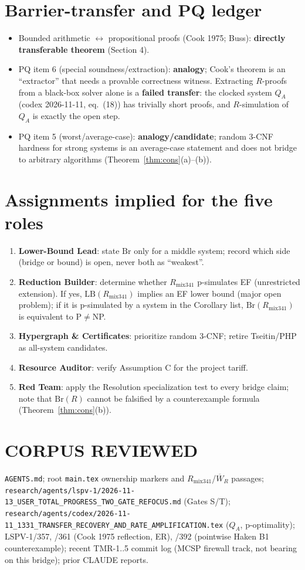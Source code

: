 \documentclass[11pt]{article}
\theoremstyle{definition}
\theoremstyle{remark}
\newcommand{\Br}{\mathrm{Br}}
\newcommand{\LB}{\mathrm{LB}}
\begin{document}
\section{Barrier-transfer and PQ ledger}
\begin{itemize}
\item Bounded arithmetic $\leftrightarrow$ propositional proofs (Cook 1975; Buss): \textbf{directly transferable theorem} (Section 4).
\item PQ item 6 (special soundness/extraction): \textbf{analogy}; Cook's theorem is an ``extractor'' that needs a provable
correctness witness. Extracting $R$-proofs from a black-box solver alone is a \textbf{failed transfer}: the clocked
system $Q_A$ (codex 2026-11-11, eq.~(18)) has trivially short proofs, and $R$-simulation of $Q_A$ is exactly the
open step.
\item PQ item 5 (worst/average-case): \textbf{analogy/candidate}; random 3-CNF hardness for strong systems is an
average-case statement and does not bridge to arbitrary algorithms (Theorem~\ref{thm:cons}(a)--(b)).
\end{itemize}

\section{Assignments implied for the five roles}
\begin{enumerate}
\item \textbf{Lower-Bound Lead}: state $\Br$ only for a middle system; record which side (bridge or bound) is open, never both as ``weakest''.
\item \textbf{Reduction Builder}: determine whether $R_{\mathrm{mix341}}$ p-simulates EF (unrestricted extension).
If yes, $\LB(R_{\mathrm{mix341}})$ implies an EF lower bound (major open problem); if it is p-simulated by a system
in the Corollary list, $\Br(R_{\mathrm{mix341}})$ is equivalent to P$\ne$NP.
\item \textbf{Hypergraph \& Certificates}: prioritize random 3-CNF; retire Tseitin/PHP as all-system candidates.
\item \textbf{Resource Auditor}: verify Assumption C for the project tariff.
\item \textbf{Red Team}: apply the Resolution specialization test to every bridge claim; note that $\Br(R)$ cannot be
falsified by a counterexample formula (Theorem~\ref{thm:cons}(b)).
\end{enumerate}

\section*{CORPUS REVIEWED}
\texttt{AGENTS.md}; root \texttt{main.tex} ownership markers and $R_{\mathrm{mix341}}$/$\overline W_R$ passages;
\texttt{research/agents/lspv-1/2026-11-13\_USER\_TOTAL\_PROGRESS\_TWO\_GATE\_REFOCUS.md} (Gates S/T);
\texttt{research/agents/codex/2026-11-11\_1331\_TRANSFER\_RECOVERY\_AND\_RATE\_AMPLIFICATION.tex} ($Q_A$, p-optimality);
LSPV-1/357, /361 (Cook 1975 reflection, ER), /392 (pointwise Haken B1 counterexample);
recent TMR-1..5 commit log (MCSP firewall track, not bearing on this bridge); prior CLAUDE reports.
\end{document}

